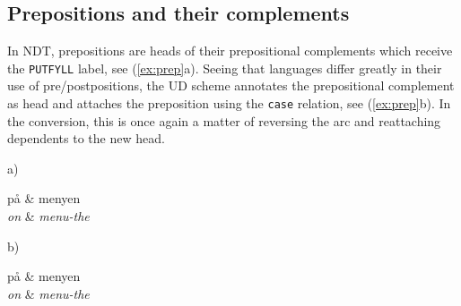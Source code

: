 \documentclass[10pt, a4paper]{article}
\let\w=\emph
\begin{document}
\subsection{Prepositions and their complements}
In NDT, prepositions are heads of their prepositional complements
which receive the {\tt PUTFYLL} label, see (\ref{ex:prep}a). Seeing
that languages differ greatly in their use of pre/postpositions, the
UD scheme annotates the prepositional complement as head and attaches
the preposition using the {\tt case} relation, see (\ref{ex:prep}b). In the
conversion, this is once again a matter of reversing the arc and reattaching dependents to the new head.
\begin{examples}
\item\label{ex:prep}
\begin{minipage}[t]{2.5cm}
a)
    \begin{dependency}
        \begin{deptext}[column sep=.2cm]
            p{\aa} \& menyen \\
            \w{on} \& \w{menu-the} \\
        \end{deptext}
    \end{dependency}
\end{minipage}
\hspace{0.5cm}
\begin{minipage}[t]{2.5cm}
b)
    \begin{dependency}
        \begin{deptext}[column sep=.2cm]
            p{\aa} \& menyen \\
            \w{on} \& \w{menu-the} \\
        \end{deptext}
    \end{dependency}
\end{minipage}
\end{examples}
\end{document}
